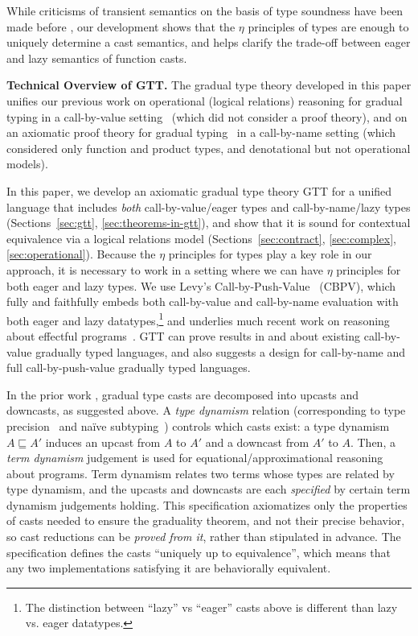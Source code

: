 \documentclass[acmsmall,screen,12pt]{acmart}
\newcommand{\ltdyn}{\sqsubseteq}
\begin{document}
While criticisms of transient semantics on the basis of type soundness
have been made before \citep{greenmanfelleisen:2018}, our development
shows that the $\eta$ principles of types are enough to uniquely
determine a cast semantics, and helps clarify the trade-off between
eager and lazy semantics of function casts.

\textbf{Technical Overview of GTT.}  The gradual type theory developed
in this paper unifies our previous work on
operational (logical relations) reasoning for gradual typing in a
call-by-value setting~\citep{newahmed18} (which did not consider a proof theory), and on an
axiomatic proof theory for gradual typing~\citep{newlicata2018-fscd} in
a call-by-name setting (which considered only function and product
types, and denotational but not operational models).

In this paper, we develop an axiomatic gradual type theory GTT for a unified
language that includes \emph{both} call-by-value/eager types and
call-by-name/lazy types (Sections~\ref{sec:gtt}, \ref{sec:theorems-in-gtt}), and
show that it is sound for contextual equivalence via a logical relations model
(Sections~\ref{sec:contract}, \ref{sec:complex}, \ref{sec:operational}).
Because the $\eta$ principles for types play a key role in our approach, it is
necessary to work in a setting where we can have $\eta$ principles for both
eager and lazy types.  We use Levy's
Call-by-Push-Value~\citep{levy03cbpvbook} (CBPV), which fully and faithfully
embeds both call-by-value and call-by-name evaluation with both eager and lazy
datatypes,\footnote{The distinction between ``lazy'' vs ``eager'' casts above is
  different than lazy vs. eager datatypes.}  and underlies much recent work on
reasoning about effectful programs~\cite{bauerpretnar13eff,lindley+17frank}.
GTT can prove results in and about existing call-by-value gradually typed
languages, and also suggests a design for call-by-name and full
call-by-push-value gradually typed languages.

In the prior work \cite{newlicata2018-fscd,newahmed18}, gradual type
casts are decomposed into upcasts and downcasts, as suggested above.
%
A \emph{type dynamism}
relation (corresponding to type precision~\cite{refined} and na\"ive
subtyping~\cite{wadler-findler09}) controls which casts exist: a type
dynamism $A \ltdyn A'$ induces an upcast from $A$ to $A'$ and a downcast
from $A'$ to $A$.  Then, a \emph{term dynamism} judgement is used for
equational/approximational reasoning about programs.  Term dynamism
relates two terms whose types are related by type dynamism, and the
upcasts and downcasts are each \emph{specified} by certain term
dynamism judgements holding.
%
This specification axiomatizes only the properties of casts needed to
ensure the graduality theorem, and not their precise behavior, so cast
reductions can be \emph{proved from it}, rather than stipulated in
advance.  The specification defines the casts ``uniquely up to
equivalence'', which means that any two implementations satisfying it
are behaviorally equivalent.
\end{document}

